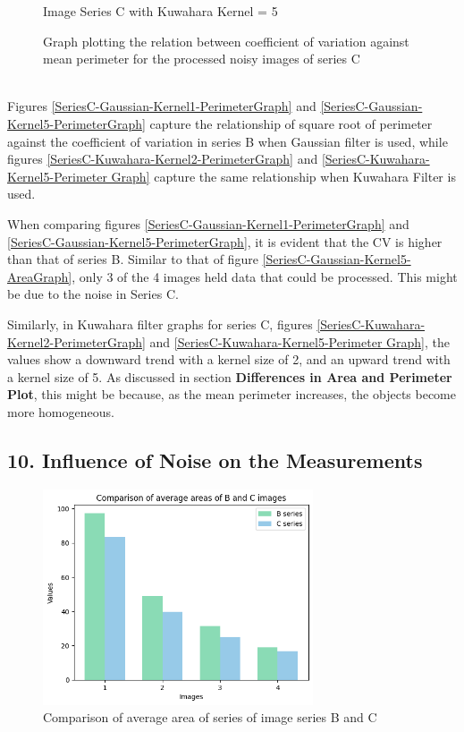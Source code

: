 \documentclass[runningheads]{llncs}
\begin{document}
\begin{figure}[h!]
\begin{minipage}[h]{0.47\linewidth}
\begin{center}
\caption{Image Series C with Kuwahara Kernel = 5}
\label{SeriesC-Kuwahara-Kernel5-Perimeter Graph}
\end{center}
\end{minipage}
\caption*{ Graph plotting the relation between coefficient of variation against mean perimeter for the processed noisy images of series C}
\label{SeriesC-Gaussian/Kuwahara-PerimeterGraph}
\end{figure}

~\\ Figures \ref{SeriesC-Gaussian-Kernel1-PerimeterGraph} and \ref{SeriesC-Gaussian-Kernel5-PerimeterGraph} capture the relationship of square root of perimeter against the coefficient of variation in series B when Gaussian filter is used, while figures \ref{SeriesC-Kuwahara-Kernel2-PerimeterGraph} and \ref{SeriesC-Kuwahara-Kernel5-Perimeter Graph} capture the same relationship when Kuwahara Filter is used. 
\par When comparing figures \ref{SeriesC-Gaussian-Kernel1-PerimeterGraph} and \ref{SeriesC-Gaussian-Kernel5-PerimeterGraph}, it is evident that the CV is higher than that of series B. Similar to that of figure \ref{SeriesC-Gaussian-Kernel5-AreaGraph}, only 3 of the 4 images held data that could be processed. This might be due to the noise in Series C. 
\par Similarly, in Kuwahara filter graphs for series C, figures \ref{SeriesC-Kuwahara-Kernel2-PerimeterGraph} and \ref{SeriesC-Kuwahara-Kernel5-Perimeter Graph}, the values show a downward trend with a kernel size of 2, and an upward trend with a kernel size of 5. As discussed in section \textbf{Differences in Area and Perimeter Plot}, this might be because, as the mean perimeter increases, the objects become more homogeneous. 
\newpage

\subsection*{10. Influence of Noise on the Measurements}

\begin{figure}
\includegraphics[width=8cm]{Report/Result_Images/barplot_1.png}
\centering
\caption{Comparison of average area of series of image series B and C}
\label{Area-Comparison-Average}
\end{figure}
\end{document}
